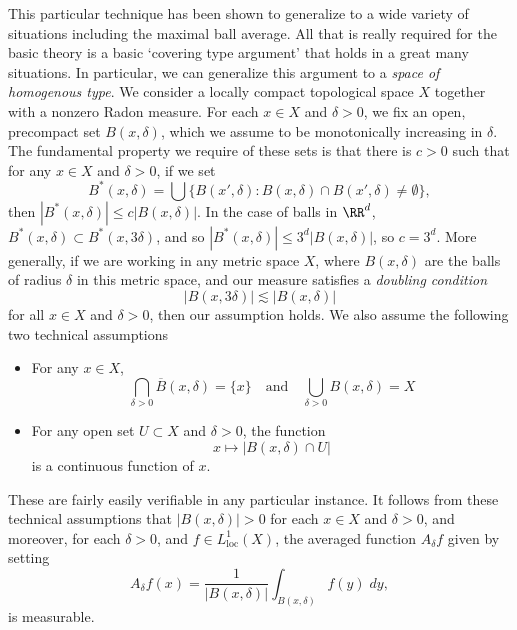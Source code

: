 This particular technique has been shown to generalize to a wide variety of situations including the maximal ball average. All that is really required for the basic theory is a basic `covering type argument' that holds in a great many situations. In particular, we can generalize this argument to a \emph{space of homogenous type}. We consider a locally compact topological space $X$ together with a nonzero Radon measure. For each $x \in X$ and $\delta > 0$, we fix an open, precompact set $B(x,\delta)$, which we assume to be monotonically increasing in $\delta$. The fundamental property we require of these sets is that there is $c > 0$ such that for any $x \in X$ and $\delta > 0$, if we set
%
\[ B^*(x,\delta) = \bigcup \{ B(x',\delta): B(x,\delta) \cap B(x',\delta) \neq \emptyset \}, \]
%
then $|B^*(x,\delta)| \leq c |B(x,\delta)|$. In the case of balls in $\RR^d$, $B^*(x,\delta) \subset B^*(x,3\delta)$, and so $|B^*(x,\delta)| \leq 3^d |B(x,\delta)|$, so $c = 3^d$. More generally, if we are working in any metric space $X$, where $B(x,\delta)$ are the balls of radius $\delta$ in this metric space, and our measure satisfies a \emph{doubling condition}
%
\[ |B(x,3\delta)| \lesssim |B(x,\delta)| \]
%
for all $x \in X$ and $\delta > 0$, then our assumption holds. We also assume the following two technical assumptions
%
\begin{itemize}
  \item For any $x \in X$,
  \[ \bigcap_{\delta > 0} \overline{B}(x,\delta) = \{ x \} \quad\text{and}\quad \bigcup_{\delta > 0} B(x,\delta) = X \]

  \item For any open set $U \subset X$ and $\delta > 0$, the function
  \[ x \mapsto |B(x,\delta) \cap U| \]
  is a continuous function of $x$.
\end{itemize}
%
These are fairly easily verifiable in any particular instance. It follows from these technical assumptions that $|B(x,\delta)| > 0$ for each $x \in X$ and $\delta > 0$, and moreover, for each $\delta > 0$, and $f \in L^1_{\text{loc}}(X)$, the averaged function $A_\delta f$ given by setting
%
\[ A_\delta f(x) = \frac{1}{|B(x,\delta)|} \int_{B(x,\delta)} f(y)\; dy, \]
%
is measurable.

